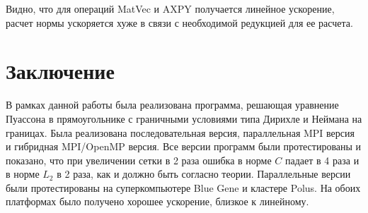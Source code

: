 \documentclass[12pt]{article}
\begin{document}
Видно, что для операций MatVec и AXPY получается линейное ускорение,
расчет нормы ускоряется хуже в связи с необходимой редукцией для ее расчета. 
\newpage


\section{Заключение}
В рамках данной работы была реализована программа, решающая уравнение Пуассона в прямоугольнике с граничными условиями типа Дирихле и Неймана на границах. 
Была реализована последовательная версия, параллельная MPI версия и гибридная MPI/OpenMP версия. 
Все версии программ были протестированы и показано, что при увеличении сетки в 2 раза ошибка в норме $C$ падает в 4 раза и в норме $L_2$ в 2 раза, как и должно быть согласно теории. 
Параллельные версии были протестированы на суперкомпьютере Blue Gene и кластере Polus. 
На обоих платформах было получено хорошее ускорение, близкое к линейному.
\end{document}
